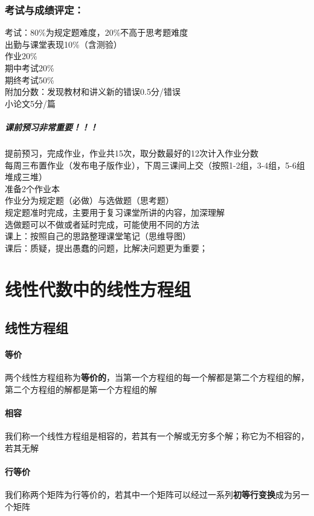 \documentclass{article}
\begin{document}
\begin{CJK}{UTF8}{gkai}
\subsubsection{考试与成绩评定：}
考试：80\%为规定题难度，20\%不高于思考题难度\\
出勤与课堂表现10\%（含测验）\\
作业20\%\\
期中考试20\%\\
期终考试50\%\\
附加分数：发现教材和讲义新的错误0.5分/错误\\
小论文5分/篇\\
\subparagraph{课前预习非常重要！！！}
提前预习，完成作业，作业共15次，取分数最好的12次计入作业分数\\
每周三布置作业（发布电子版作业），下周三课间上交（按照1-2组，3-4组，5-6组堆成三堆）\\
准备2个作业本\\
作业分为规定题（必做）与选做题（思考题）\\
规定题准时完成，主要用于复习课堂所讲的内容，加深理解\\
选做题可以不做或者延时完成，可能使用不同的方法\\
课上：按照自己的思路整理课堂笔记（思维导图）\\
课后：质疑，提出愚蠢的问题，比解决问题更为重要；\\

\newpage
\section{线性代数中的线性方程组}
\subsection{线性方程组}
\paragraph{等价\\}
两个线性方程组称为\textbf{等价的}，当第一个方程组的每一个解都是第二个方程组的解，第二个方程组的解都是第一个方程组的解\\
\paragraph{相容\\}
我们称一个线性方程组是相容的，若其有一个解或无穷多个解；称它为不相容的，若其无解\\
\paragraph{行等价\\}
我们称两个矩阵为行等价的，若其中一个矩阵可以经过一系列\textbf{初等行变换}成为另一个矩阵\\

\end{CJK}
\end{document}
